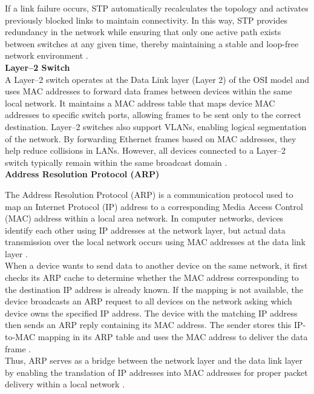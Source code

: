 \documentclass[a4paper,12pt]{article}
\begin{document}
\noindent
If a link failure occurs, STP automatically recalculates the topology and activates previously blocked links to maintain connectivity. In this way, STP provides redundancy in the network while ensuring that only one active path exists between switches at any given time, thereby maintaining a stable and loop-free network environment \cite{wiki_stp}.\\

\noindent
\textbf{Layer--2 Switch}\\
\noindent
A Layer--2 switch operates at the Data Link layer (Layer 2) of the OSI model and uses MAC addresses to forward data frames between devices within the same local network. It maintains a MAC address table that maps device MAC addresses to specific switch ports, allowing frames to be sent only to the correct destination. Layer--2 switches also support VLANs, enabling logical segmentation of the network. By forwarding Ethernet frames based on MAC addresses, they help reduce collisions in LANs. However, all devices connected to a Layer--2 switch typically remain within the same broadcast domain \cite{gfg_layer2_layer3_switch}. \\

\noindent
\textbf{Address Resolution Protocol (ARP)}

\noindent
The Address Resolution Protocol (ARP) is a communication protocol used to map an Internet Protocol (IP) address to a corresponding Media Access Control (MAC) address within a local area network. In computer networks, devices identify each other using IP addresses at the network layer, but actual data transmission over the local network occurs using MAC addresses at the data link layer \cite{wiki_arp}. \\

\noindent
When a device wants to send data to another device on the same network, it first checks its ARP cache to determine whether the MAC address corresponding to the destination IP address is already known. If the mapping is not available, the device broadcasts an ARP request to all devices on the network asking which device owns the specified IP address. The device with the matching IP address then sends an ARP reply containing its MAC address. The sender stores this IP-to-MAC mapping in its ARP table and uses the MAC address to deliver the data frame \cite{wiki_arp}.\\

\noindent
Thus, ARP serves as a bridge between the network layer and the data link layer by enabling the translation of IP addresses into MAC addresses for proper packet delivery within a local network \cite{wiki_arp}.\\
\end{document}
